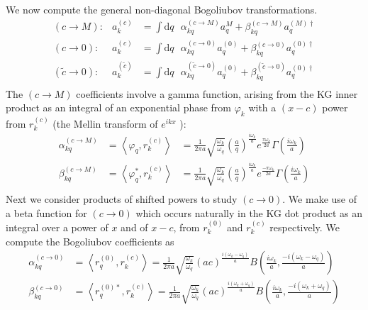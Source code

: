 \documentclass[12pt,a4paper]{article}
\newcommand{\dv}[1]{\mathrm{d} #1 \text{ }}
\begin{document}
We now compute the general non-diagonal Bogoliubov transformations.
\begin{equation}
  \begin{array}{rll}
  (c \rightarrow M) : & a^{(c)}_k &= \int \dv{q} \alpha^{(c \rightarrow M)}_{kq} a^{M}_q + \beta^{(c \rightarrow M)}_{kq} a^{(M)\dagger}_q \\
  (c \rightarrow 0) : &   a^{(c)}_k &= \int \dv{q} \alpha^{(c \rightarrow 0)}_{kq} a^{(0)}_q + \beta^{(c \rightarrow 0)}_{kq} a^{(0)\dagger}_q \\
  (\widetilde{c} \rightarrow 0) : &   a^{(\tilde{c})}_k &= \int \dv{q} \alpha^{(\widetilde{c} \rightarrow 0)}_{kq} a^{(0)}_q + \beta^{(\widetilde{c} \rightarrow 0)}_{kq} a^{(0)\dagger}_q \\
  \end{array}
\end{equation}
The $(c \rightarrow M)$ coefficients involve a gamma function, arising from the KG inner product as an integral of an exponential phase from $\varphi_k$ with a $(x-c)$ power from $r_k^{(c)}$ (the Mellin transform of $e^{ikx}$ \cite{bracewell1966fourier}):
\begin{equation}
  \begin{array}{ccl}
    \alpha^{(c \rightarrow M)}_{kq} &= \left<\varphi_q, r_k^{(c)} \right> &= \frac{1}{2 \pi a} \sqrt{\frac{\omega_k}{\omega_q}} \left(\frac{a}{q}\right)^{\frac{i\omega_k}{a}} e^{\frac{\pi \omega_k}{2a}} \Gamma\left(\frac{i\omega_k}{a}\right) \\
    \beta^{(c \rightarrow M)}_{kq} &= \left<\varphi_q^*, r_k^{(c)} \right> &= \frac{1}{2 \pi a} \sqrt{\frac{\omega_k}{\omega_q}} \left(\frac{a}{q}\right)^{\frac{i\omega_k}{a}} e^{\frac{-\pi \omega_k}{2a}} \Gamma\left(\frac{i\omega_k}{a}\right) \\
  \end{array}
  \label{bogoCM}
\end{equation}
Next we consider products of shifted powers to study $(c \rightarrow 0)$. We make use of a beta function for $(c \rightarrow 0)$ which occurs naturally in the KG dot product as an integral over a power of $x$ and of $x-c$, from $r_k^{(0)}$ and $r_k^{(c)}$ respectively.  We compute the Bogoliubov coefficients as
\begin{equation}
  \begin{aligned}
    \alpha^{(c \rightarrow 0)}_{kq} &= \left<r_q^{(0)}, r_k^{(c)} \right> = \frac{1}{2 \pi a}\sqrt{\frac{\omega_k}{\omega_q}} (ac)^{\frac{i(\omega_k - \omega_q)}{a}} B\left(\frac{i\omega_k}{a}, \frac{-i(\omega_k - \omega_q)}{a}\right) \\
    \beta^{(c \rightarrow 0)}_{kq} &= \left<r_q^{(0)*}, r_k^{(c)} \right> = \frac{1}{2 \pi a}\sqrt{\frac{\omega_k}{\omega_q}} (ac)^{\frac{i(\omega_k + \omega_q)}{a}} B\left(\frac{i\omega_k}{a}, \frac{-i(\omega_k + \omega_q)}{a}\right) \\
  \end{aligned}
  \label{bogoC0}
\end{equation}
\end{document}
